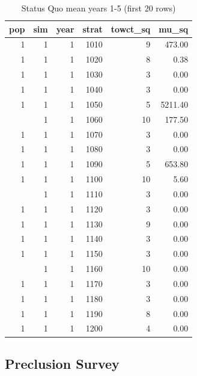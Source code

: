 \documentclass[
]{article}
\begin{document}
\begin{table}[H]

\caption{\label{tab:unnamed-chunk-7}Status Quo mean years 1-5 (first 20 rows)}
\centering
\fontsize{8}{10}\selectfont
\begin{tabular}[t]{rrrrrr}
\toprule
pop & sim & year & strat & towct\_sq & mu\_sq\\
\midrule
1 & 1 & 1 & 1010 & 9 & 473.00\\
1 & 1 & 1 & 1020 & 8 & 0.38\\
1 & 1 & 1 & 1030 & 3 & 0.00\\
1 & 1 & 1 & 1040 & 3 & 0.00\\
1 & 1 & 1 & 1050 & 5 & 5211.40\\
\addlinespace
1 & 1 & 1 & 1060 & 10 & 177.50\\
1 & 1 & 1 & 1070 & 3 & 0.00\\
1 & 1 & 1 & 1080 & 3 & 0.00\\
1 & 1 & 1 & 1090 & 5 & 653.80\\
1 & 1 & 1 & 1100 & 10 & 5.60\\
\addlinespace
1 & 1 & 1 & 1110 & 3 & 0.00\\
1 & 1 & 1 & 1120 & 3 & 0.00\\
1 & 1 & 1 & 1130 & 9 & 0.00\\
1 & 1 & 1 & 1140 & 3 & 0.00\\
1 & 1 & 1 & 1150 & 3 & 0.00\\
\addlinespace
1 & 1 & 1 & 1160 & 10 & 0.00\\
1 & 1 & 1 & 1170 & 3 & 0.00\\
1 & 1 & 1 & 1180 & 3 & 0.00\\
1 & 1 & 1 & 1190 & 8 & 0.00\\
1 & 1 & 1 & 1200 & 4 & 0.00\\
\bottomrule
\end{tabular}
\end{table}

\subsection{Preclusion Survey}\label{preclusion-survey}
\end{document}

